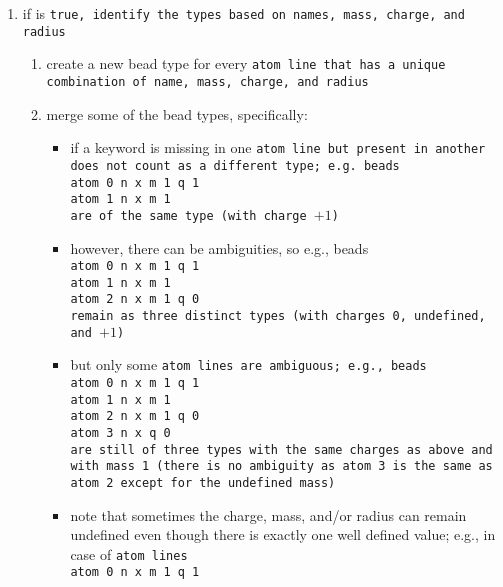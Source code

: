 \begin{enumerate}
    \begin{enumerate}
      \item if  is \tt{true}, identify the types based on names,
        mass, charge, and radius
        \begin{enumerate}
          \item create a new bead type for every \tt{atom} line that has a
            unique combination of name, mass, charge, and radius
          \item merge some of the bead types, specifically:
            \begin{itemize}[label=$-$]
              \item if a keyword is missing in one \tt{atom} line but present
                in another does not count as a different type; e.g. beads\\
                \tt{atom 0 n x m 1 q 1}\\
                \tt{atom 1 n x m 1}\\
                are of the same type (with charge $+1$)
              \item however, there can be ambiguities, so e.g., beads\\
                \tt{atom 0 n x m 1 q 1}\\
                \tt{atom 1 n x m 1}\\
                \tt{atom 2 n x m 1 q 0}\\
                remain as three distinct types (with charges 0, \tt{undefined},
                and $+1$)
              \item but only some \tt{atom} lines are ambiguous; e.g., beads\\
                \tt{atom 0 n x m 1 q 1}\\
                \tt{atom 1 n x m 1}\\
                \tt{atom 2 n x m 1 q 0}\\
                \tt{atom 3 n x q 0}\\
                are still of three types with the same charges as above and
                with mass 1 (there is no ambiguity as \tt{atom 3} is the same as
                \tt{atom 2} except for the undefined mass)
              \item note that sometimes the charge, mass, and/or radius can
                remain undefined even though there is exactly one well defined
                value; e.g., in case of \tt{atom} lines\\
                \tt{atom 0 n x m 1 q 1}\\

\end{itemize}
\end{enumerate}
\end{enumerate}
\end{enumerate}
